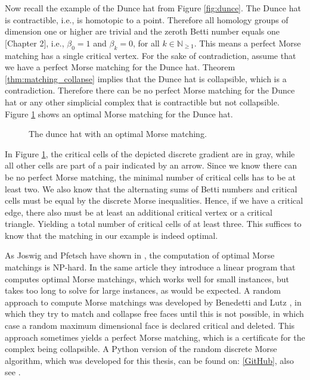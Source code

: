 Now recall the example of the Dunce hat from Figure \ref{fig:dunce}. The Dunce hat is contractible, i.e., is homotopic to a point. Therefore all homology groups of dimension one or higher are trivial and the zeroth Betti number equals one \cite{MunkresElements}[Chapter 2], i.e., $\beta_0 = 1$ and $\beta_k = 0$, for all $k\in \mathbb{N}_{\geq 1}$. This means a perfect Morse matching has a single critical vertex. For the sake of contradiction, assume that we have a perfect Morse matching for the Dunce hat. Theorem \ref{thm:matching_collapse} implies that the Dunce hat is collapsible, which is a contradiction. Therefore there can be no perfect Morse matching for the Dunce hat or any other simplicial complex that is contractible but not collapsible. Figure \ref{fig:morse_dunce} shows an optimal Morse matching for the Dunce hat.

\begin{figure}[H]
\begin{subfigure}[c]{0.95\textwidth}
\begin{center}

\end{center}
\end{subfigure}
\caption{The dunce hat with an optimal Morse matching.}
\label{fig:morse_dunce}
\end{figure}

In Figure \ref{fig:morse_dunce}, the critical cells of the depicted discrete gradient are in gray, while all other cells are part of a pair indicated by an arrow. Since we know there can be no perfect Morse matching, the minimal number of critical cells has to be at least two. We also know that the alternating sums of Betti numbers and critical cells must be equal by the discrete Morse inequalities. Hence, if we have a critical edge, there also must be at least an additional critical vertex or a critical triangle. Yielding a total number of critical cells of at least three. This suffices to know that the matching in our example is indeed optimal. 

As Joswig and Pfetsch have shown in \cite{joswig2004computing}, the computation of optimal Morse matchings is NP-hard. In the same article they introduce a linear program that computes optimal Morse matchings, which works well for small instances, but takes too long to solve for large instances, as would be expected. A random approach to compute Morse matchings was developed by Benedetti and Lutz \cite{lutzbenedetti}, in which they try to match and collapse free faces until this is not possible, in which case a random maximum dimensional face is declared critical and deleted. This approach sometimes yields a perfect Morse matching, which is a certificate for the complex being collapsible. A Python version of the random discrete Morse algorithm, which was developed for this thesis, can be found on: \href{https://github.com/IvanSpirandelli/Masterarbeit/blob/master/Algorithms/random_discrete_morse.py}{[GitHub]}, also see \cite{github}. 